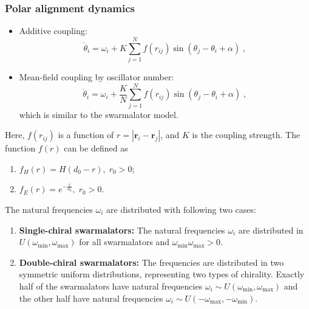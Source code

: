 \documentclass{article}
\begin{document}
\subsubsection{Polar alignment dynamics}
\begin{itemize}
    \item Additive coupling: 
    \begin{equation}
        \label{eq:additionalCouplingDotTheta}
        \dot{\theta}_i=\omega _i+K\sum_{j=1}^{N}f\left( r_{ij} \right)\sin \left( \theta _j-\theta _i+\alpha \right)\;,
    \end{equation}
    \item Mean-field coupling by oscillator number:
    \begin{equation}
        \label{eq:swarmalatorDotTheta}
        \dot{\theta}_i=\omega _i+\frac{K}{N}\sum_{j=1}^N{f}\left( r_{ij} \right) \sin \left( \theta _j-\theta _i+\alpha \right) \;,
    \end{equation}
    which is similar to the swarmalator model.
\end{itemize}
Here,  $f\left( r_{ij} \right)$ is a function of $r=\left| \mathbf{r}_i-\mathbf{r}_j \right|$, and $K$ is the coupling strength. 
The function $f\left( r \right)$ can be defined as
\begin{enumerate}
    \item $f_H\left( r \right)=H\left( d_0-r \right),\;r_0>0$;
    \item $f_E\left( r \right)=e^{-\frac{r}{d_0}},\;r_0>0$.
\end{enumerate}
The natural frequencies $\omega_i$ are distributed with following two cases:
\begin{enumerate}
    \item \textbf{Single-chiral swarmalators:} The natural frequencies $\omega_i$ are distributed in $U\left( \omega _{\min},\omega _{\max} \right)$ for all swarmalators and $\omega _{\min}\omega _{\max}>0$.
    
    \item \textbf{Double-chiral swarmalators:} The frequencies are distributed in two symmetric uniform distributions, representing two types of chirality. Exactly half of the swarmalators have natural frequencies $\omega_i \sim U\left( \omega _{\min},\omega _{\max} \right)$ and the other half have natural frequencies $\omega_i \sim U\left( -\omega _{\max},-\omega _{\min} \right)$.
\end{enumerate}
\end{document}
